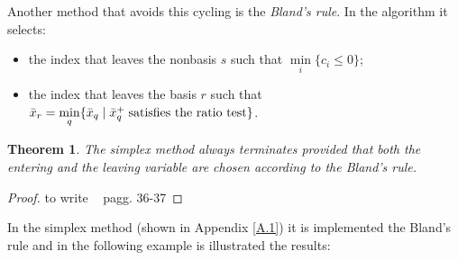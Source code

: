 \documentclass[a4paper,10 pt,titlepage,twoside]{book}
\theoremstyle{plain}
\newtheorem*{theorem*}{Theorem}
\theoremstyle{definition}
\theoremstyle{remark}
\begin{document}
Another method that avoids this cycling is the \textit{Bland's rule}. In the algorithm it selects:
\begin{itemize}
	\item the index that leaves the nonbasis $s$ such that $\min\limits_{i}\{c_{i}\leq0\}$;
\item the index that leaves the basis $r$ such that $\bar{x}_{r} = \min\limits_{q}\{\bar{x}_{q}\;|\;\bar{x}_{q}^{+} \text{\;satisfies the ratio test} \}$. \end{itemize} 
\begin{theorem*}
	The simplex method always terminates provided that both the entering and the leaving variable are chosen according to the Bland's rule.
\end{theorem*}
\begin{proof}
to write ~\cite{LP} pagg. 36-37	
\end{proof}
In the simplex method (shown in Appendix \ref{A.1}) it is implemented the Bland's rule and in the following example is illustrated the results:
\end{document}
